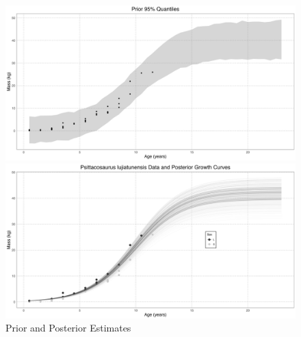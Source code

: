 \documentclass[letterpaper]{article}
\begin{document}
\begin{figure}[H]
  \centering
  \begin{minipage}[b]{0.45\textwidth}
    \centering
    \includegraphics[width=\textwidth]{images/psittacosaurusPrior.png}
  \end{minipage}
  \begin{minipage}[b]{0.45\textwidth}
    \centering
    \includegraphics[width=\textwidth]{images/psittacosaurusPosterior.png}
  \end{minipage}
    \label{fig:psittacosaurusPriorPosterior}
    \caption{\psit{} Prior and Posterior Estimates}
\end{figure} 
\end{document}
